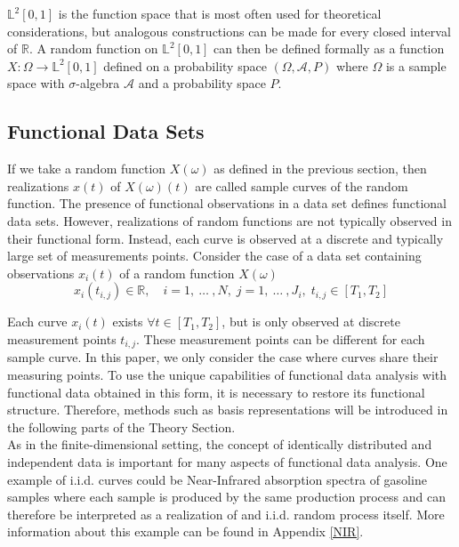 \documentclass[11pt,twoside,a4paper]{article}
\begin{document}
	$\mathbb{L}^2[0,1]$ is the function space that is most often used for theoretical considerations, but analogous constructions can be made for every closed interval of $\mathbb{R}$. 
	A random function on $\mathbb{L}^2[0,1]$ can then be defined formally as a function $X : \Omega \rightarrow \mathbb{L}^2[0,1]$ defined on a probability space $(\Omega, \mathcal{A}, P)$ where $\Omega$ is a sample space with $\sigma$-algebra $\mathcal{A}$ and a probability space $P$.
	
	\subsection{Functional Data Sets}
	If we take a random function $X(\omega)$ as defined in the previous section, then realizations $x(t)$ of $X(\omega)(t)$ are called sample curves of the random function. The presence of functional observations in a data set defines functional data sets. However,  realizations of random functions are not typically observed in their functional form. Instead, each curve is observed at a discrete and typically large set of measurements points. Consider the case of a data set containing observations $x_i(t)$ of a random function $X(\omega)$
	\begin{equation}
		x_{i}(t_{i,j}) \in \mathbb{R}, \quad i = 1,\: \dots\: ,N, \; j = 1, \: \dots \:, J_i, \; t_{i,j} \in [T_1, T_2]
	\end{equation}
	
	Each curve $x_i(t)$ exists $\forall t \in [T_1, T_2]$, but is only observed at discrete measurement points $t_{i,j}$. These measurement points can be different for each sample curve. In this paper, we only consider the case where curves share their measuring points.
	To use the unique capabilities of functional data analysis with functional data obtained in this form, it is necessary to restore its functional structure. Therefore, methods such as basis representations will be introduced in the following parts of the Theory Section.\\
	As in the finite-dimensional setting, the concept of identically distributed and independent data is important for many aspects of functional data analysis. One example of i.i.d. curves could be Near-Infrared absorption spectra of gasoline samples where each sample is produced by the same production process and can therefore be interpreted as a realization of and i.i.d. random process itself. More information about this example can be found in Appendix \ref{NIR}.
	
\end{document}
